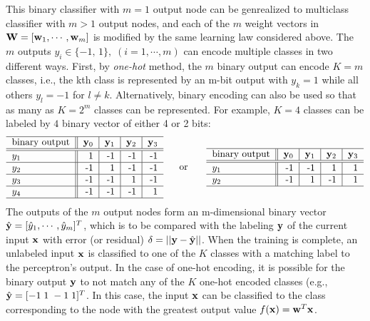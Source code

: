 \documentclass{article}
\begin{document}
This binary classifier with $m=1$ output node can be genrealized to 
multiclass classifier with $m>1$ output nodes, and each of the $m$ 
weight vectors in ${\bf W}=[{\bf w}_1,\cdots,{\bf w}_m]$ is modified 
by the same learning law considered above. The $m$ outputs 
$y_i\in\{-1,\,1\},\;(i=1,\cdots,m)$ can encode multiple classes in two
different ways. First, by {\em one-hot} method, the $m$ binary output 
can encode $K=m$ classes, i.e., the kth class is represented by an
m-bit output with $y_k=1$ while all others $y_l=-1$ for $l\ne k$. 
Alternatively, binary encoding can also be used so that as many as 
$K=2^m$ classes can be represented. For example, $K=4$ classes can be
labeled by $4$ binary vector of either 4 or 2 bits:
\begin{equation}
  \begin{tabular}{l||r|r|r|r} \hline
    \mbox{binary output} & ${\bf y}_0$ & ${\bf y}_1$ & ${\bf y}_2$ & ${\bf y}_3$ \\ \hline\hline
    $y_1$ &  1 & -1 & -1 & -1 \\ \hline
    $y_2$ & -1 & 1 & -1 & -1 \\ \hline
    $y_3$ & -1 & -1 & 1 & -1 \\ \hline
    $y_4$ & -1 & -1 & -1 & 1 \\ \hline
  \end{tabular} 
  \;\;\;\;\;\;\mbox{or}\;\;\;\;\;\;\;
  \begin{tabular}{l||r|r|r|r} \hline
    \mbox{binary output} & ${\bf y}_0$ & ${\bf y}_1$ & ${\bf y}_2$ & ${\bf y}_3$ \\ \hline\hline
    $y_1$ & -1 & -1 & 1 & 1 \\ \hline
    $y_2$ & -1 & 1 & -1 & 1 \\ \hline
  \end{tabular} 
\end{equation}
The outputs of the $m$ output nodes form an m-dimensional binary vector
$\hat{\bf y}=[\hat{y}_1,\cdots,\hat{y}_m]^T$, which is to be compared 
with the labeling ${\bf y}$ of the current input ${\bf x}$ with error 
(or residual) $\delta=||{\bf y}-\hat{\bf y}||$. When the training is 
complete, an unlabeled input ${\bf x}$ is classified to one of the $K$
classes with a matching label to the perceptron's output. In the case
of one-hot encoding, it is possible for the binary output ${\bf y}$ to 
not match any of the $K$ one-hot encoded classes (e.g., 
$\hat{\bf y}=[-1\;1\;-1\;1]^T$. In this case, the input ${\bf x}$ can be
classified to the class corresponding to the node with the greatest output
value $f({\bf x})={\bf w}^T{\bf x}$. 
\end{document}
